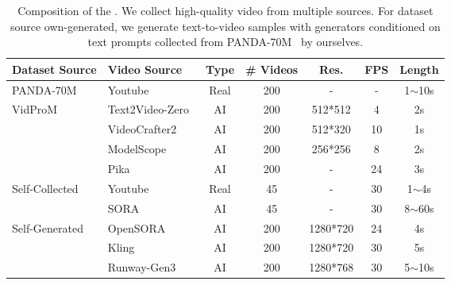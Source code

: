 
\begin{table}[t]
\centering
\scriptsize
\setlength{\tabcolsep}{1pt} %
\begin{tabular}{l|l|ccccc}
\toprule
 \textbf{Dataset Source} &\textbf{Video Source} & \textbf{Type} & \textbf{\# Videos}  & \textbf{Res.} & \textbf{FPS} & \textbf{Length} \\
\midrule
PANDA-70M~\cite{chen2024panda70mcaptioning70mvideos} & Youtube & Real & 200 & - & - & 1$\sim$10s \\
\midrule
VidProM~\cite{wang2024vidprommillionscalerealpromptgallery} & Text2Video-Zero~\cite{khachatryan2023text2videozerotexttoimagediffusionmodels} & AI & 200 & 512*512 & 4 & 2s \\
 & VideoCrafter2~\cite{chen2024videocrafter2overcomingdatalimitations} & AI & 200 & 512*320 & 10 & 1s \\
 & ModelScope~\cite{wang2023modelscopetexttovideotechnicalreport} & AI & 200 & 256*256 & 8 & 2s \\
 & Pika~\cite{pika} & AI & 200 & - & 24 & 3s \\

\midrule

Self-Collected & Youtube & Real & 45  & - & 30 & 1$\sim$4s \\
 & SORA~\cite{videoworldsimulators2024} & AI & 45 & - & 30 & 8$\sim$60s \\

\midrule

Self-Generated & OpenSORA~\cite{opensora} & AI & 200  & 1280*720 & 24 & 4s \\
 & Kling~\cite{klingai} & AI & 200 & 1280*720 & 30 & 5s \\
 & Runway-Gen3~\cite{runway3} & AI & 200 & 1280*768 & 30 & 5$\sim$10s \\

\bottomrule
\end{tabular}
\vspace{-2mm}
\caption{Composition of the \vidfor. We collect high-quality video from multiple sources. For dataset source own-generated, we generate text-to-video samples with generators conditioned on text prompts collected from PANDA-70M~\cite{chen2024panda70mcaptioning70mvideos} by ourselves.}
\label{tab:video_dataset_detail}
\vspace{-2mm}
\end{table}

